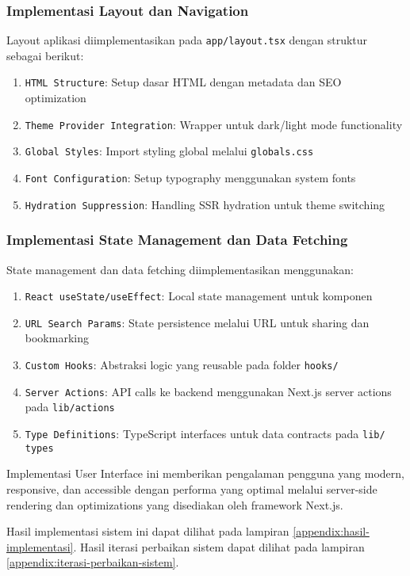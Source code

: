 \subsubsection{Implementasi Layout dan Navigation}

Layout aplikasi diimplementasikan pada \texttt{app/layout.tsx} dengan struktur sebagai berikut:

\begin{enumerate}
	\item \texttt{HTML Structure}: Setup dasar HTML dengan metadata dan SEO optimization
	\item \texttt{Theme Provider Integration}: Wrapper untuk dark/light mode functionality
	\item \texttt{Global Styles}: Import styling global melalui \texttt{globals.css}
	\item \texttt{Font Configuration}: Setup typography menggunakan system fonts
	\item \texttt{Hydration Suppression}: Handling SSR hydration untuk theme switching
\end{enumerate}

\subsubsection{Implementasi State Management dan Data Fetching}

State management dan data fetching diimplementasikan menggunakan:

\begin{enumerate}
	\item \texttt{React useState/useEffect}: Local state management untuk komponen
	\item \texttt{URL Search Params}: State persistence melalui URL untuk sharing dan bookmarking
	\item \texttt{Custom Hooks}: Abstraksi logic yang reusable pada folder \texttt{hooks/}
	\item \texttt{Server Actions}: API calls ke backend menggunakan Next.js server actions pada \texttt{lib/actions}
	\item \texttt{Type Definitions}: TypeScript interfaces untuk data contracts pada \texttt{lib/\\types}
\end{enumerate}

Implementasi User Interface ini memberikan pengalaman pengguna yang modern, responsive, dan accessible dengan performa yang optimal melalui server-side rendering dan optimizations yang disediakan oleh framework Next.js.

Hasil implementasi sistem ini dapat dilihat pada lampiran \ref{appendix:hasil-implementasi}. Hasil iterasi perbaikan sistem dapat dilihat pada lampiran \ref{appendix:iterasi-perbaikan-sistem}.